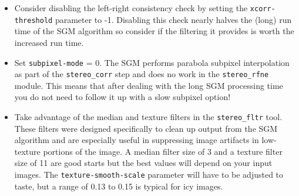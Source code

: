 \begin{itemize}
\item Consider disabling the left-right consistency check by setting the \texttt{xcorr-threshold}
parameter to -1.  Disabling this check nearly halves the (long) run time of the SGM
algorithm so consider if the filtering it provides is worth the increased run time.
\item Set \texttt{subpixel-mode} = 0.  The SGM performs parabola subpixel interpolation as part of
the \texttt{stereo\_corr} step and does no work in the \texttt{stereo\_rfne} module.  This means that
after dealing with the long SGM processing time you do not need to follow it up with a slow subpixel option!
\item Take advantage of the median and texture filters in the \texttt{stereo\_fltr} tool.  These filters
were designed specifically to clean up output from the SGM algorithm and are especially useful in suppressing
image artifacts in low-texture portions of the image.  A median filter size of 3 and a texture filter size of 11
are good starts but the best values will depend on your input images. The \texttt{texture-smooth-scale}
parameter will have to be adjusted to taste, but a range of 0.13 to 0.15 is typical for icy images.
\end{itemize}

